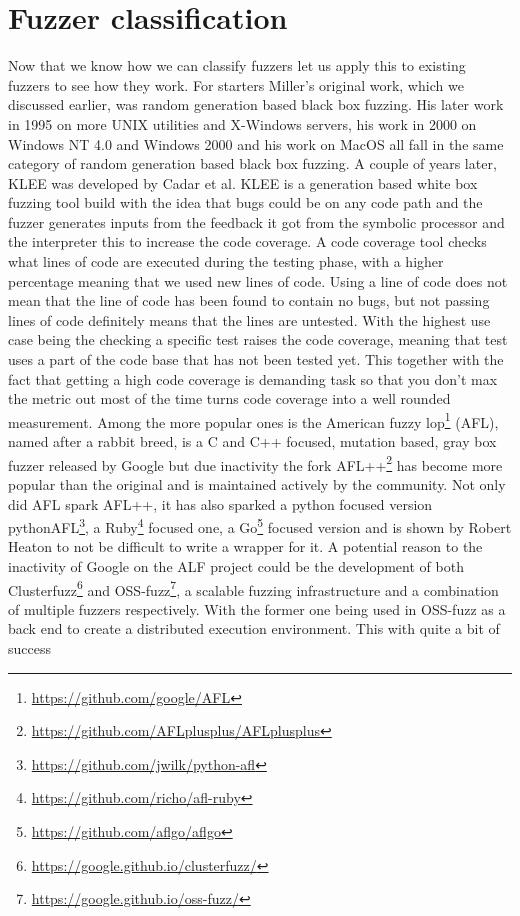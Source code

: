 \section{Fuzzer classification}
Now that we know how we can classify fuzzers let us apply this to existing fuzzers to see how they work. For starters Miller's original work, which we discussed earlier, was random generation based black box fuzzing. His later work in 1995 on more UNIX utilities and X-Windows servers\cite{26miller1995fuzzrevisited}, his work in 2000 on Windows NT 4.0 and Windows 2000\cite{24MillerWindows} and his work on MacOS \cite{25MillerOnMacOS} all fall in the same category of random generation based black box fuzzing.
A couple of years later, KLEE was developed\cite{8KLEE} by Cadar et al. KLEE is a generation based white box fuzzing tool build with the idea that bugs could be on any code path and the fuzzer generates inputs from the feedback it got from the symbolic processor and the interpreter this to increase the code coverage. A code coverage tool checks what lines of code are executed during the testing phase, with a higher percentage meaning that we used new lines of code.
Using a line of code does not mean that the line of code has been found to contain no bugs, but not passing lines of code definitely means that the lines are untested. With the highest use case being the checking a specific test raises the code coverage, meaning that test uses a part of the code base that has not been tested yet. This together with the fact that getting a high code coverage is demanding task so that you don't max the metric out most of the time turns code coverage into a well rounded measurement.
Among the more popular ones is the American fuzzy lop\footnote{\url{https://github.com/google/AFL}} (AFL), named after a rabbit breed, is a C and C++ focused, mutation based, gray box fuzzer released by Google but due inactivity the fork AFL++\cite{27AFL++}\footnote{\url{https://github.com/AFLplusplus/AFLplusplus}} has become more popular than the original and is maintained actively by the community. Not only did AFL spark AFL++, it has also sparked a python focused version pythonAFL\footnote{\url{https://github.com/jwilk/python-afl}}, a  Ruby\footnote{\url{https://github.com/richo/afl-ruby}} focused one, a Go\footnote{\url{https://github.com/aflgo/aflgo}} focused version and is shown by Robert Heaton\cite{AFLWrapper} to not be difficult to write a wrapper for it. A potential reason to the inactivity of Google on the ALF project could be the development of both Clusterfuzz\footnote{\url{https://google.github.io/clusterfuzz/}} and OSS-fuzz\footnote{\url{https://google.github.io/oss-fuzz/}}, a  scalable fuzzing infrastructure and a combination of multiple fuzzers respectively. With the former one being used in OSS-fuzz as a back end to create a distributed execution environment. This with quite a bit of success
